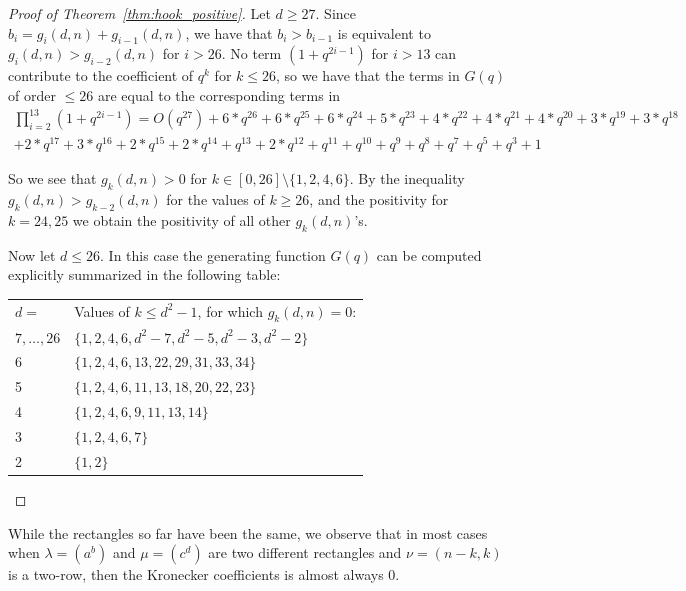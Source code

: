 \documentclass{article}
\numberwithin{equation}{section}
\theoremstyle{definition}
\begin{document}
\begin{proof}[Proof of Theorem~\ref{thm:hook_positive}]
Let $d \geq 27$. 
Since  $b_i = g_i(d,n) + g_{i-1}(d,n)$, we have that $b_i > b_{i-1}$ is equivalent to $g_i(d,n) > g_{i-2}(d,n)$ for $i>26$. 
No term $(1+q^{2i-1})$ for $i>13$ can contribute to the coefficient of $q^k$ for $k\leq 26$, so we have that the  terms in $G(q)$ of order $\leq 26$ are equal to the corresponding terms in 
\begin{align*} \prod_{i=2}^{13} (1+q^{2i-1}) = O(q^{27})+  6*q^{26}+6*q^{25}+6*q^{24}+5*q^{23}+4*q^{22}+4*q^{21}+4*q^{20}+3*q^{19}+3*q^{18} \\
+2*q^{17}+3*q^{16}+2*q^{15}+2*q^{14}+q^{13}+2*q^{12}+q^{11}+q^{10}+q^{9}+q^{8}+q^{7}+q^{5}+q^{3}+1
\end{align*}

So we see that $g_k(d,n) >0$ for $k \in [0,26] \setminus \{1,2,4,6\}$. By the inequality $g_k(d,n) > g_{k-2}(d,n)$ for the  values of $k \geq 26$, and the positivity for $k=24,25$ we obtain the positivity of all other $g_k(d,n)$'s. 

Now let $d \leq 26$. In this case the generating function $G(q)$ can be computed explicitly summarized in the following table:

\begin{tabular}{p{1in}p{4in}}
$d=$ & Values of $k \leq d^2-1$, for which $g_k(d,n)=0$: \\
$7,\ldots,26$ & $\{1,2,4,6, d^2-7, d^2 -5, d^2 - 3, d^2- 2 \}$ \\
6 & $\{1,2,4,6,13,22,29, 31, 33, 34\}$\\
5 & $\{1,2,4,6,11,13, 18, 20, 22, 23\}$\\
4 & $\{ 1,2,4,6, 9, 11, 13, 14\}$\\
3 & $\{1,2,4,6,7\}$\\
2& $\{1,2\}$ \\
\end{tabular}

\end{proof}


While the rectangles so far have been the same, we observe that in most cases when $\lambda=(a^b)$ and $\mu=(c^d)$ are two different rectangles and $\nu=(n-k,k)$ is a two-row, then the Kronecker coefficients is almost always 0.
\end{document}
